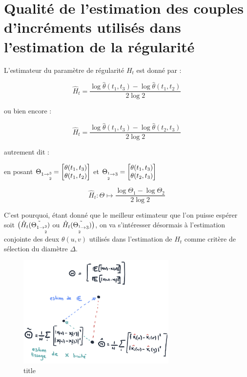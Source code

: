 \section{Qualité de l'estimation des couples d'incréments utilisés dans l'estimation de la régularité}



L'estimateur du paramètre de régularité $H_t$ est donné par :

$$\hat H_t = \frac{ \log \hat \theta(t_1, t_3) - \log \hat \theta(t_1, t_2) }{2 \log 2}$$

ou bien encore :

$$\hat H_t = \frac{ \log \hat \theta(t_1, t_3) - \log \hat \theta(t_2, t_3) }{2 \log 2}$$


autrement dit :

en posant $\Theta_{1 \rightarrow \overset{3}{\underset {2}{}}} = \begin{bmatrix} \theta(t_1, t_3) \\ \theta(t_1, t_2) \end{bmatrix}$ et $\Theta_{\overset 1{\underset{2}{ }} \rightarrow3} = \begin{bmatrix} \theta(t_1, t_3) \\ \theta(t_2, t_3) \end{bmatrix}$

$$
\hat H_t : \Theta \longmapsto \frac{ \log \Theta_1 - \log \Theta_2 }{2 \log 2}
$$

C'est pourquoi, étant donné que le meilleur estimateur que l'on puisse espérer soit $\bigl(\hat H_t( \tilde {\Theta_{1 \rightarrow \overset{3}{\underset {2}{}}}})$ ou $\hat H_t( \tilde {\Theta_{\overset 1{\underset{2}{ }} \rightarrow3}})\bigr)$, on va s'intéresser désormais à l'estimation conjointe des deux $\theta(u,v)$ utilisés dans l'estimation de $H_t$ comme critère de sélection du diamètre $\Delta$.

\begin{figure}[H]
    \centering
    \includegraphics[width=0.7\textwidth]{Images/sketches/theta_biais.jpg}
    \caption{title}
    \label{fig:sketch_theta_biais}
\end{figure}


